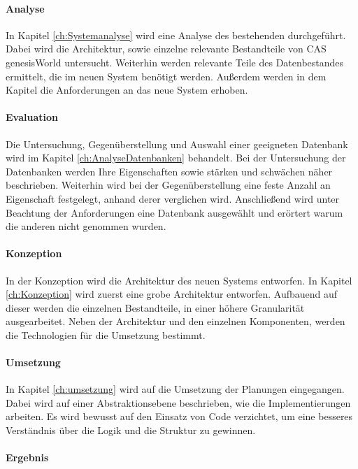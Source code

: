 \paragraph{Analyse} In Kapitel \ref{ch:Systemanalyse} wird eine Analyse des bestehenden durchgeführt. Dabei wird die Architektur, sowie einzelne relevante Bestandteile von CAS genesisWorld untersucht. Weiterhin werden relevante Teile des Datenbestandes ermittelt, die im neuen System benötigt werden. Außerdem werden in dem Kapitel die Anforderungen an das neue System erhoben.

\paragraph{Evaluation} Die Untersuchung, Gegenüberstellung und Auswahl einer geeigneten Datenbank wird im Kapitel \ref{ch:AnalyseDatenbanken} behandelt. Bei der Untersuchung der Datenbanken werden Ihre Eigenschaften sowie stärken und schwächen näher beschrieben. Weiterhin wird bei der Gegenüberstellung eine feste Anzahl an Eigenschaft festgelegt, anhand derer verglichen wird. Anschließend wird unter Beachtung der Anforderungen eine Datenbank ausgewählt und erörtert warum die anderen nicht genommen wurden.  

\paragraph{Konzeption} In der Konzeption wird die Architektur des neuen Systems entworfen. In Kapitel \ref{ch:Konzeption} wird zuerst eine grobe Architektur entworfen. Aufbauend auf dieser werden die einzelnen Bestandteile, in einer höhere Granularität ausgearbeitet. Neben der Architektur und den einzelnen Komponenten, werden die Technologien für die Umsetzung bestimmt. 

\paragraph{Umsetzung} In Kapitel \ref{ch:umsetzung} wird auf die Umsetzung der Planungen eingegangen. Dabei wird auf einer Abstraktionsebene beschrieben, wie die Implementierungen arbeiten. Es wird bewusst auf den Einsatz von Code verzichtet, um eine besseres Verständnis über die Logik und die Struktur zu gewinnen. 

\paragraph{Ergebnis} 

